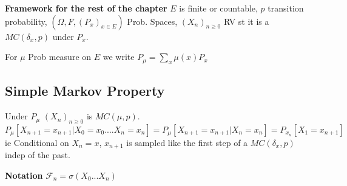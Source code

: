 \documentclass[12pt]{book}
\theoremstyle{definition}
\theoremstyle{remark}
\begin{document}
\noindent
\textbf{Framework for the rest of the chapter} 
$E$ is finite or countable, $p$ transition probability, $(\Omega, F, (P_x)_{x \in E})$ Prob. Spaces, $(X_n)_{n \geq 0}$ RV st it is a  $MC(\delta_x, p)$ under $P_x$.

For $\mu$ Prob measure on $E $ we write $P_\mu= \sum_{x}\mu(x)P_x$

\subsection{Simple Markov Property}
Under $P_\mu$ $(X_n)_{n \geq 0}$ is $MC(\mu, p)$.
$P_\mu [X_{n+1}=x_{n+1} | X_0 = x_0....X_n=x_n] = P_\mu[X_{n+1}=x_{n+1}| X_n = x_n] = P_{x_n}[X_1 =x_{n+1}]$ ie Conditional on $X_n=x$, $x_{n+1}$ is sampled like the first step of a $MC(\delta_{x},p)$ indep of the past.

\textbf{Notation} $ \mathcal{F}_n = \sigma(X_0...X_n)$ 
\end{document}
